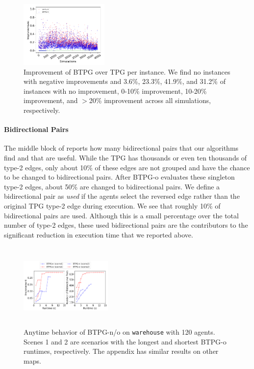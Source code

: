 \documentclass[letterpaper]{article} %
\theoremstyle{definition}
\begin{document}
\begin{figure}[t!]
\centering
\includegraphics[width=0.39\textwidth]{Figs/scatter.png}
\caption{Improvement of BTPG over TPG per instance. We find no instances with negative improvements and 3.6\%, 23.3\%,  41.9\%, and 31.2\% of instances with no improvement, 0-10\% improvement, 10-20\% improvement, and $>$20\% improvement across all simulations, respectively.}
\label{fig:scatter plot}
\end{figure}

\paragraph{Bidirectional Pairs} The middle block of  reports how many bidirectional pairs that our algorithms find and that are useful. While the TPG has thousands or even ten thousands of type-2 edges, only about 10\% of these edges are not grouped and have the chance to be changed to bidirectional pairs. After BTPG-o evaluates these singleton type-2 edges, about 50\% are changed to bidirectional pairs. We define a bidirectional pair as \emph{used} if the agents select the reversed edge rather than the original TPG type-2 edge during execution. We see that roughly 10\% of bidirectional pairs are used. Although this is a small percentage over the total number of type-2 edges, these used bidirectional pairs are the contributors to the significant reduction in execution time that we reported above.




\begin{figure}[t!]
\centering
\includegraphics[width=0.405\textwidth,height=1.67in ]{Figs/anytime_warehouse.png}
\caption{Anytime behavior of BTPG-n/o on \texttt{warehouse} with 120 agents. Scenes 1 and 2 are scenarios with the longest and shortest BTPG-o runtimes, respectively. The appendix has similar results on other maps.}
\label{fig:anytime}
\end{figure}
\end{document}
